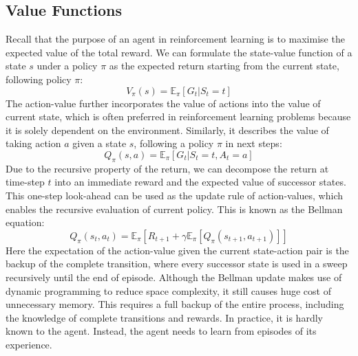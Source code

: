 \documentclass[oneside,11pt,a4paper]{article}
\begin{document}
\subsection{Value Functions}
Recall that the purpose of an agent in reinforcement learning is to maximise the expected value of the total reward. We can formulate the state-value function of a state $s$ under a policy $\pi$ as the expected return starting from the current state, following policy $\pi$:
$$
V_\pi(s) = \mathbb E_\pi[G_t|S_t=t]
$$
The action-value further incorporates the value of actions into the value of current state, which is often preferred in reinforcement learning problems because it is solely dependent on the environment. Similarly, it describes the value of taking action $a$ given a state $s$, following a policy $\pi$ in next steps:
$$
Q_\pi(s,a) = \mathbb E_\pi[G_t|S_t = t, A_t = a]
$$
Due to the recursive property of the return, we can decompose the return at time-step $t$ into an immediate reward and the expected value of successor states. This one-step look-ahead can be used as the update rule of action-values, which enables the recursive evaluation of current policy. This is known as the Bellman equation:
$$
Q_\pi(s_t,a_t) = \mathbb E_\pi[R_{t+1} + \gamma\mathbb E_\pi [Q_\pi(s_{t+1}, a_{t+1})]]
$$
Here the expectation of the action-value given the current state-action pair is the backup of the complete transition, where every successor state is used in a sweep recursively until the end of episode. Although the Bellman update makes use of dynamic programming to reduce space complexity, it still causes huge cost of unnecessary memory. This requires a full backup of the entire process, including the knowledge of complete transitions and rewards. In practice, it is hardly known to the agent. Instead, the agent needs to learn from episodes of its experience.
\end{document}
